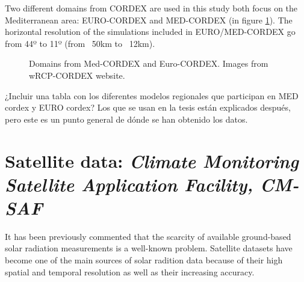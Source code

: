Two different domains from CORDEX are used in this study both focus on the Mediterranean area: EURO-CORDEX and MED-CORDEX (in figure \ref{fig:cordexdomain}). The horizontal resolution of the simulations included in EURO/MED-CORDEX go from 44º to 11º (from ~50km to ~12km).

\begin{figure}[!tbp]
  \centering
  \hfill
  \caption{Domains from Med-CORDEX and Euro-CORDEX. Images from wRCP-CORDEX website.}
    \label{fig:cordexdomain}
\end{figure}

{\color{red}¿Incluir una tabla con los diferentes modelos regionales que participan en MED cordex y EURO cordex? Los que se usan en la tesis están explicados después, pero este es un punto general de dónde se han obtenido los datos.}
\section{Satellite data: \textit{Climate Monitoring Satellite Application Facility, CM-SAF}}

It has been previously commented that the scarcity of available ground-based solar radiation measurements is a well-known problem. Satellite datasets have become one of the main sources of solar radition data because of their high spatial and temporal resolution as well as their increasing accuracy.\\

